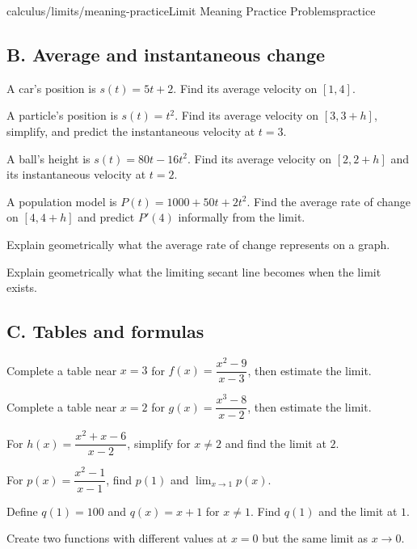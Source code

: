 \documentclass[11pt,openany]{book}
\theoremstyle{bgplain}
\begin{document}
\begin{webpage}{calculus/limits/meaning-practice}{Limit Meaning Practice Problems}{practice}
\subsection*{B. Average and instantaneous change}

\begin{bgexercises}[label=\textbf{1.\arabic*},resume]
  \item A car's position is \(s(t)=5t+2\). Find its average velocity on \([1,4]\).
  \item A particle's position is \(s(t)=t^2\). Find its average velocity on \([3,3+h]\), simplify, and predict the instantaneous velocity at \(t=3\).
  \item A ball's height is \(s(t)=80t-16t^2\). Find its average velocity on \([2,2+h]\) and its instantaneous velocity at \(t=2\).
  \item A population model is \(P(t)=1000+50t+2t^2\). Find the average rate of change on \([4,4+h]\) and predict \(P'(4)\) informally from the limit.
  \item Explain geometrically what the average rate of change represents on a graph.
  \item Explain geometrically what the limiting secant line becomes when the limit exists.
\end{bgexercises}

\subsection*{C. Tables and formulas}

\begin{bgexercises}[label=\textbf{1.\arabic*},resume]
  \item Complete a table near \(x=3\) for \(f(x)=\dfrac{x^2-9}{x-3}\), then estimate the limit.
  \item Complete a table near \(x=2\) for \(g(x)=\dfrac{x^3-8}{x-2}\), then estimate the limit.
  \item For \(h(x)=\dfrac{x^2+x-6}{x-2}\), simplify for \(x\ne2\) and find the limit at \(2\).
  \item For \(p(x)=\dfrac{x^2-1}{x-1}\), find \(p(1)\) and \(\lim_{x\to1}p(x)\).
  \item Define \(q(1)=100\) and \(q(x)=x+1\) for \(x\ne1\). Find \(q(1)\) and the limit at \(1\).
  \item Create two functions with different values at \(x=0\) but the same limit as \(x\to0\).
\end{bgexercises}


\end{webpage}
\end{document}
